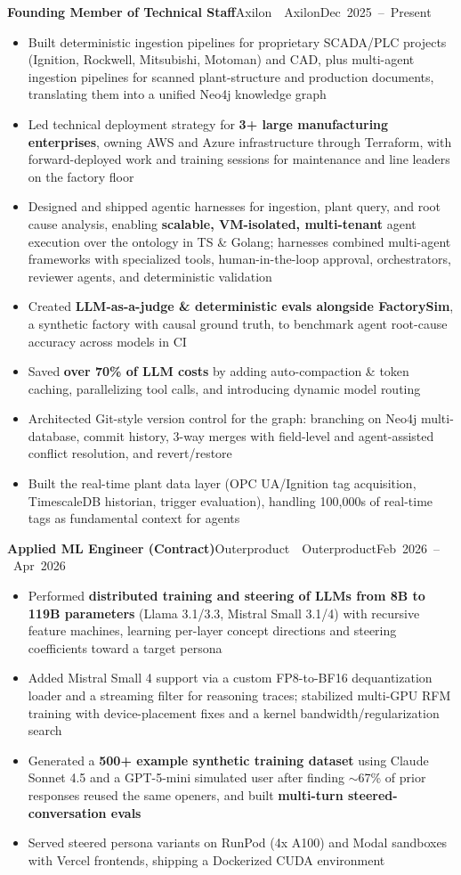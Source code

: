 \documentclass[letterpaper,11pt]{article}
\newcommand{\entry}[3]{%
  \needspace{4\baselineskip}%
  \textbf{#1}\ifx\relax#2\relax\else\ \textbar\ #2\fi\hfill\mbox{#3}\par}
\newenvironment{bullets}
  {\begin{itemize}[leftmargin=1.2em, label=\textbullet, itemsep=0.5pt, parsep=0pt, topsep=2pt]}
  {\end{itemize}\vspace{5pt}}
\begin{document}
\entry{Founding Member of Technical Staff}{Axilon}{Dec 2025 -- Present}
\begin{bullets}
  \item Built deterministic ingestion pipelines for proprietary SCADA/PLC projects (Ignition, Rockwell, Mitsubishi, Motoman) and CAD, plus multi-agent ingestion pipelines for scanned plant-structure and production documents, translating them into a unified Neo4j knowledge graph
  \item Led technical deployment strategy for \textbf{3+ large manufacturing enterprises}, owning AWS and Azure infrastructure through Terraform, with forward-deployed work and training sessions for maintenance and line leaders on the factory floor
  \item Designed and shipped agentic harnesses for ingestion, plant query, and root cause analysis, enabling \textbf{scalable, VM-isolated, multi-tenant} agent execution over the ontology in TS \& Golang; harnesses combined multi-agent frameworks with specialized tools, human-in-the-loop approval, orchestrators, reviewer agents, and deterministic validation
  \item Created \textbf{LLM-as-a-judge \& deterministic evals alongside FactorySim}, a synthetic factory with causal ground truth, to benchmark agent root-cause accuracy across models in CI
  \item Saved \textbf{over 70\% of LLM costs} by adding auto-compaction \& token caching, parallelizing tool calls, and introducing dynamic model routing
  \item Architected Git-style version control for the graph: branching on Neo4j multi-database, commit history, 3-way merges with field-level and agent-assisted conflict resolution, and revert/restore
  \item Built the real-time plant data layer (OPC UA/Ignition tag acquisition, TimescaleDB historian, trigger evaluation), handling 100,000s of real-time tags as fundamental context for agents
\end{bullets}

\entry{Applied ML Engineer (Contract)}{Outerproduct}{Feb 2026 -- Apr 2026}
\begin{bullets}
  \item Performed \textbf{distributed training and steering of LLMs from 8B to 119B parameters} (Llama 3.1/3.3, Mistral Small 3.1/4) with recursive feature machines, learning per-layer concept directions and steering coefficients toward a target persona
  \item Added Mistral Small 4 support via a custom FP8-to-BF16 dequantization loader and a streaming filter for reasoning traces; stabilized multi-GPU RFM training with device-placement fixes and a kernel bandwidth/regularization search
  \item Generated a \textbf{500+ example synthetic training dataset} using Claude Sonnet 4.5 and a GPT-5-mini simulated user after finding $\sim$67\% of prior responses reused the same openers, and built \textbf{multi-turn steered-conversation evals}
  \item Served steered persona variants on RunPod (4x A100) and Modal sandboxes with Vercel frontends, shipping a Dockerized CUDA environment
\end{bullets}
\end{document}
